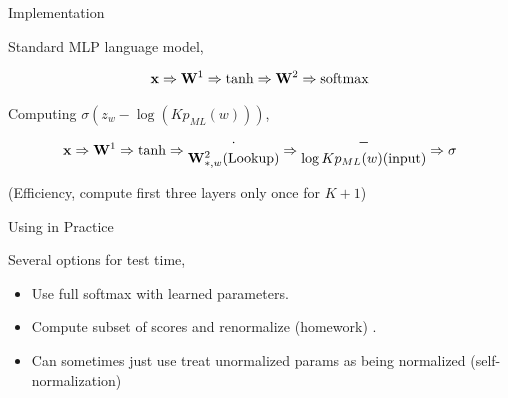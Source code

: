 \documentclass{beamer}
\begin{document}
\begin{frame}{Implementation}
  
  Standard MLP language model,

  \[\boldx \Rightarrow \boldW^1 \Rightarrow \tanh \Rightarrow  \boldW^2 \Rightarrow \softmax\]



  Computing $\sigma(z_w - \log(K p_{ML}(w)))$,
 \[\mathbf{x} \Rightarrow \mathbf{W}^1 \Rightarrow \tanh \Rightarrow
 \begin{matrix}
   \cdot \\ 
   \mathbf{W}^2_{*, w} \mathrm{(Lookup)}
 \end{matrix}
 \Rightarrow  \begin{matrix}
   - \\ 
   \log K p_{ML}(w) \mathrm{(input)}
 \end{matrix}
\Rightarrow \sigma\]


 
                                                                                       

  (Efficiency, compute first three layers only once for $K+1$)
  \air 
  
\end{frame}

\begin{frame}{Using in Practice}
  
  Several options for test time,
  \begin{itemize}
  \item Use full softmax with learned parameters.
    \air 
  \item Compute subset of scores and renormalize (homework)
.
\air 

\item Can sometimes just use treat unormalized params as being normalized (self-normalization)
  \end{itemize}


\end{frame}
\end{document}
